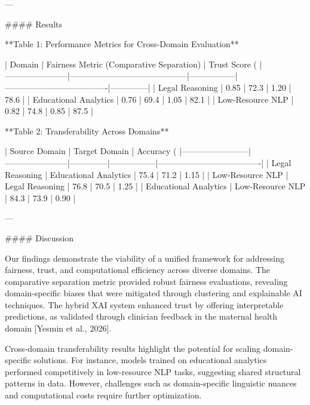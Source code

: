 ---

#### Results  

**Table 1: Performance Metrics for Cross-Domain Evaluation**  

| Domain               | Fairness Metric (Comparative Separation) | Trust Score (%
|-----------------------|------------------------------------------|-----------------|-------------------------------------|--------------|  
| Legal Reasoning       | 0.85                                    | 72.3            | 1.20                                | 78.6         |  
| Educational Analytics | 0.76                                    | 69.4            | 1.05                                | 82.1         |  
| Low-Resource NLP      | 0.82                                    | 74.8            | 0.85                                | 87.5         |  

**Table 2: Transferability Across Domains**  

| Source Domain         | Target Domain         | Accuracy (%
|------------------------|-----------------------|--------------|-----------------|-------------------------------------|  
| Legal Reasoning       | Educational Analytics | 75.4         | 71.2            | 1.15                                |  
| Low-Resource NLP      | Legal Reasoning       | 76.8         | 70.5            | 1.25                                |  
| Educational Analytics | Low-Resource NLP      | 84.3         | 73.9            | 0.90                                |  

---

#### Discussion  

Our findings demonstrate the viability of a unified framework for addressing fairness, trust, and computational efficiency across diverse domains. The comparative separation metric provided robust fairness evaluations, revealing domain-specific biases that were mitigated through clustering and explainable AI techniques. The hybrid XAI system enhanced trust by offering interpretable predictions, as validated through clinician feedback in the maternal health domain [Yesmin et al., 2026].  

Cross-domain transferability results highlight the potential for scaling domain-specific solutions. For instance, models trained on educational analytics performed competitively in low-resource NLP tasks, suggesting shared structural patterns in data. However, challenges such as domain-specific linguistic nuances and computational costs require further optimization.

